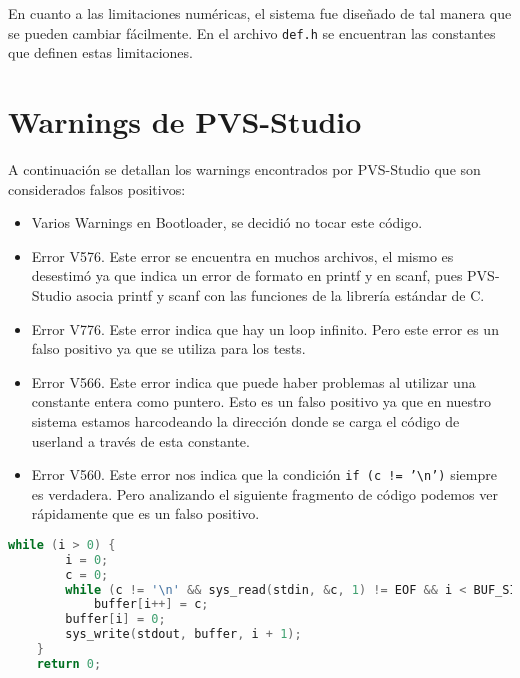 \documentclass{article}
\begin{document}
En cuanto a las limitaciones numéricas, el sistema fue diseñado de tal manera que se pueden cambiar fácilmente. En el archivo \texttt{def.h} se encuentran las constantes que definen estas limitaciones.

\section {Warnings de PVS-Studio}
A continuación se detallan los warnings encontrados por PVS-Studio que son considerados falsos positivos:
\begin{itemize}
    \item Varios Warnings en Bootloader, se decidió no tocar este código.
    \item Error V576. Este error se encuentra en muchos archivos, el mismo es desestimó ya que indica un error de formato en printf y en scanf, pues PVS-Studio asocia printf y scanf con las funciones de la librería estándar de C. 
    \item Error V776. Este error indica que hay un loop infinito. Pero este error es un falso positivo ya que se utiliza para los tests.
    \item Error V566. Este error indica que puede haber problemas al utilizar una constante entera como puntero. Esto es un falso positivo ya que en nuestro sistema estamos harcodeando la dirección donde se carga el código de userland a través de esta constante.
    \item Error V560. Este error nos indica que la condición \texttt{if (c != '\textbackslash n')}
    siempre es verdadera. Pero analizando el siguiente fragmento de código podemos ver rápidamente que es un falso positivo.
\end{itemize}
\begin{lstlisting}[language=C]
    while (i > 0) {
        i = 0;
        c = 0;
        while (c != '\n' && sys_read(stdin, &c, 1) != EOF && i < BUF_SIZE - 1)
            buffer[i++] = c;
        buffer[i] = 0;
        sys_write(stdout, buffer, i + 1);
    }
    return 0;
\end{lstlisting}
    
\end{document}
